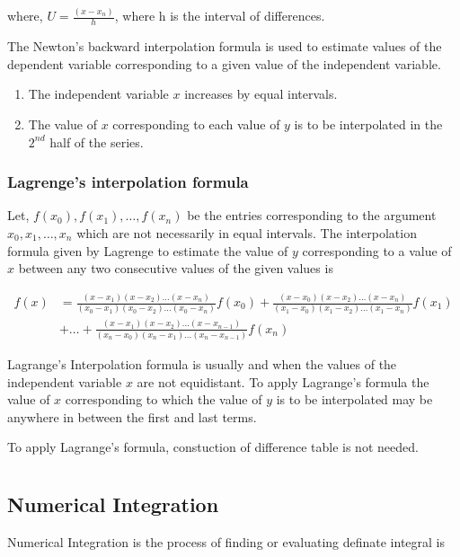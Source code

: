 \documentclass[11pt, a4paper, oneside]{book}
\begin{document}
           where, $U=\frac{(x-x_n)}{h}$, where h is the interval of differences.

           The Newton's backward interpolation formula is used to estimate values of the dependent
           variable corresponding to a given value of the independent variable.

           \begin{enumerate}
             \item The independent variable $x$ increases by equal intervals.
             \item The value of $x$ corresponding to each value of $y$ is to be interpolated in
               the $2^{nd}$ half of the series.
           \end{enumerate}

         \subsection{Lagrenge's interpolation formula}
         Let, $f(x_0),f(x_1),\dots,f(x_n)$ be the entries corresponding to the argument
         $x_0,x_1,\dots,x_n$ which are not necessarily in equal intervals. The interpolation
         formula given by Lagrenge to estimate the value of $y$ corresponding to a value of $x$
         between any two consecutive values of the given values is

         \begin{align*}
           f(x)&=\frac{(x-x_1)(x-x_2)\dots(x-x_n)}{(x_0-x_1)(x_0-x_2)\dots(x_0-x_n)}f(x_0)+\frac{(x-x_0)(x-x_2)\dots(x-x_n)}{(x_1-x_0)(x_1-x_2)\dots(x_1-x_n)}f(x_1)\\
           &+ \dots +\frac{(x-x_1)(x-x_2)\dots(x-x_{n-1})}{(x_n-x_0)(x_n-x_1)\dots(x_n-x_{n-1})}f(x_n)
         \end{align*}

         Lagrange's Interpolation formula is usually and when the values of the independent
         variable $x$ are not equidistant. To apply Lagrange's formula the value of $x$
         corresponding to which the value of $y$ is to be interpolated may be anywhere in
         between the first and last terms.

         To apply Lagrange's formula, constuction of difference table is not needed.
      \chapter{}
        \section{Numerical Integration}
          Numerical Integration is the process of finding or evaluating definate integral is
\end{document}

